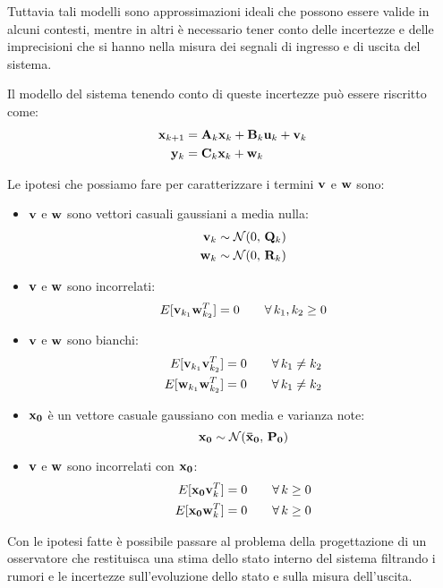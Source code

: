 Tuttavia tali modelli sono approssimazioni ideali che possono essere valide in alcuni contesti, mentre in altri è necessario tener conto delle incertezze e delle imprecisioni che si hanno nella misura dei segnali di ingresso e di uscita del sistema.

Il modello del sistema tenendo conto di queste incertezze può essere riscritto come:
\begin{align*}
\mathbf{x}_{k+1} &= \mathbf{A}_k\mathbf{x}_k + \mathbf{B}_k\mathbf{u}_k + \mathbf{v}_k \\
\mathbf{y}_k &= \mathbf{C}_k\mathbf{x}_k + \mathbf{w}_k
\end{align*}

\noindent Le ipotesi che possiamo fare per caratterizzare i termini $\mathbf{v}$ e $\mathbf{w}$ sono:
\begin{itemize}
\item $\mathbf{v}$ e $\mathbf{w}$ sono vettori casuali gaussiani a media nulla: 
\begin{align*}
 \mathbf{v}_k &\sim \mathcal{N}(0,\,\mathbf{Q}_k) \\
 \mathbf{w}_k &\sim \mathcal{N}(0,\,\mathbf{R}_k)
\end{align*}
\item $\mathbf{v}$ e $\mathbf{w}$ sono incorrelati:
 \[E[\mathbf{v}_{k_1}\mathbf{w}^T_{k_2}]=0\qquad \forall\, k_1,k_2 \geq 0\]
\item $\mathbf{v}$ e $\mathbf{w}$ sono bianchi: 
\begin{align*}
 E[\mathbf{v}_{k_1}\mathbf{v}^T_{k_2}]&=0\qquad \forall\, k_1 \neq k_2 \\
 E[\mathbf{w}_{k_1}\mathbf{w}^T_{k_2}]&=0\qquad \forall\, k_1 \neq k_2
\end{align*}
\item $\mathbf{x_0}$ è un vettore casuale gaussiano con media e varianza note:
\[\mathbf{x_0} \sim \mathcal{N}(\mathbf{\bar{x}_0},\,\mathbf{P_0})\]
\item $\mathbf{v}$ e $\mathbf{w}$ sono incorrelati con $\mathbf{x_0}$:
\begin{align*}
 E[\mathbf{x_0}\mathbf{v}^T_k]&=0\qquad \forall\, k \geq 0 \\
 E[\mathbf{x_0}\mathbf{w}^T_k]&=0\qquad \forall\, k \geq 0
\end{align*}
\end{itemize}

Con le ipotesi fatte è possibile passare al problema della progettazione di un osservatore che restituisca una stima dello stato interno del sistema filtrando i rumori e le incertezze sull'evoluzione dello stato e sulla misura dell'uscita.